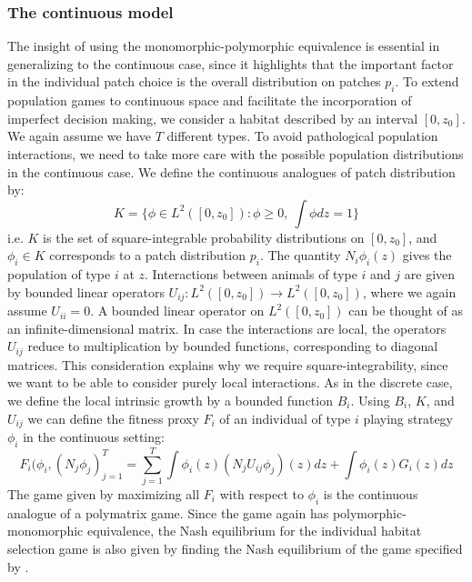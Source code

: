 \subsubsection{The continuous model}
The insight of using the monomorphic-polymorphic equivalence is essential in generalizing to the continuous case, since it highlights that the important factor in the individual patch choice  is the overall distribution on patches $p_i$. To extend population games to continuous space and facilitate the incorporation of imperfect decision making, we consider a habitat described by an interval $[0,z_0]$. We again assume we have $T$ different types. To avoid pathological population interactions, we need to take more care with the possible population distributions in the continuous case. We define the continuous analogues of patch distribution by:
\begin{equation}
  K = \{ \phi \in L^2([0,z_0]) : \phi \geq 0,~\int \phi dz = 1\}
  \label{eq:space_of_dists}
\end{equation}
i.e. $K$ is the set of square-integrable probability distributions on $[0,z_0]$, and $\phi_i \in K$ corresponds to a patch distribution $p_i$. The quantity $N_i \phi_i(z)$ gives the population of type $i$ at $z$. Interactions between animals of type $i$ and $j$ are given by bounded linear operators $U_{ij}: L^2([0,z_0]) \to L^2([0,z_0])$, where we again assume $U_{ii}=0$. A bounded linear operator on $L^2([0,z_0])$ can be thought of as an infinite-dimensional matrix. In case the interactions are local, the operators $U_{ij}$ reduce to multiplication by bounded functions, corresponding to diagonal matrices. This consideration explains why we require square-integrability, since we want to be able to consider purely local interactions. As in the discrete case, we define the local intrinsic growth by a bounded function $B_i$. Using $B_i$, $K$, and $U_{ij}$ we can define the fitness proxy $F_i$ of an individual of type $i$ playing strategy $\phi_i$ in the continuous setting:
\begin{equation}
  F_i(\phi_i, (N_j \phi_j)_{j=1}^T = \sum_{j=1}^T \int \phi_i(z) (N_j U_{ij} \phi_j)(z) dz + \int \phi_i(z) G_i(z) dz %
  \label{eq:utility}
\end{equation}
The game given by maximizing all $F_i$ with respect to $\phi_i$ is the continuous analogue of a polymatrix game. Since the game again has polymorphic-monomorphic equivalence, the Nash equilibrium for the individual habitat selection game is also given by finding the Nash equilibrium of the game specified by .

